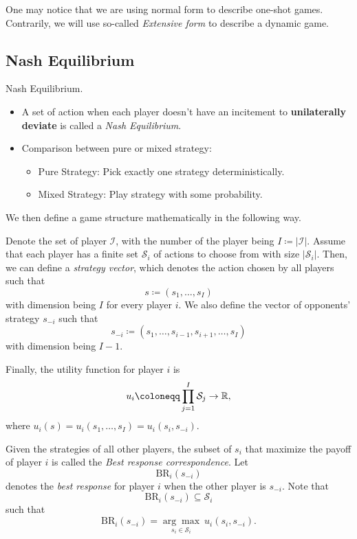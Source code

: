 \begin{note}
	One may notice that we are using normal form to describe one-shot games. Contrarily, we will use so-called \emph{Extensive form} to describe a
	dynamic game.
\end{note}

\subsection{Nash Equilibrium}
\begin{definition}
	Nash Equilibrium.
	\begin{itemize}
		\item A set of action when each player doesn't have an incitement to \textbf{unilaterally deviate} is called a \emph{Nash Equilibrium}.
		\item Comparison between pure or mixed strategy:
		      \begin{itemize}
			      \item Pure Strategy: Pick exactly one strategy deterministically.
			      \item Mixed Strategy: Play strategy with some probability.
		      \end{itemize}
	\end{itemize}
\end{definition}

We then define a game structure mathematically in the following way.
\begin{definition}
	Denote the set of player \(\mathcal{I}\), with the number of the player being \(I\coloneqq \left\vert \mathcal{I} \right\vert \).
	Assume that each player has a finite set \(\mathcal{S}_i\) of actions to choose from with size \(\left\vert \mathcal{S}_i \right\vert \).
	Then, we can define a \emph{strategy vector}, which denotes the action chosen by all players such that
	\[
		s\coloneqq (s_1, \ldots , s_I)
	\]
	with dimension being \(I\) for every player \(i\). We also define the vector of opponents' strategy \(s_{-i}\) such that
	\[
		s_{-i}\coloneqq (s_1,\ldots,s_{i - 1},s_{i + 1} ,\ldots,s_I)
	\]
	with dimension being \(I - 1\).

	Finally, the utility function for player \(i\) is
	\[
		u_{i} \coloneqq \prod\limits_{j = 1}^{I} \mathcal{S}_j \to \mathbb{\MakeUppercase{R}},
	\]
	where \(u_{i}(s) = u_{i}(s_1, \ldots , s_I) = u_{i}(s_{i}, s_{-i})\).
\end{definition}

\begin{definition}
	Given the strategies of all other players, the subset of \(s_{i}\) that maximize the payoff of player \(i\) is called the \emph{Best response correspondence}.
	Let
	\[
		\mathrm{BR}_i(s_{-i})
	\]
	denotes the \emph{best response} for player \(i\) when the other player is \(s_{-i}\). Note that
	\[
		\mathrm{BR}_i(s_{-i}) \subseteq \mathcal{S}_i
	\]
	such that
	\[
		\mathrm{BR}_i(s_{-i})= \underset{s_{i}\in\mathcal{S}_i}{\arg\max}\ u_{i}(s_{i}, s_{-i}).
	\]
\end{definition}
